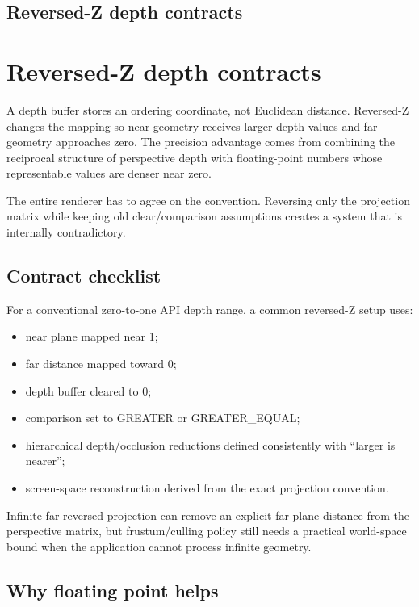 \hypertarget{appendix-275ec8847057}{}
\section*{Reversed-Z depth contracts}
\chapter{Reversed-Z depth contracts}\label{appendix-275ec8847057-reversed-z-depth-contracts}

A depth buffer stores an ordering coordinate, not Euclidean distance. Reversed-Z changes the mapping so near geometry receives larger depth values and far geometry approaches zero. The precision advantage comes from combining the reciprocal structure of perspective depth with floating-point numbers whose representable values are denser near zero.

The entire renderer has to agree on the convention. Reversing only the projection matrix while keeping old clear/comparison assumptions creates a system that is internally contradictory.

\section{Contract checklist}\label{appendix-275ec8847057-contract-checklist}

For a conventional zero-to-one API depth range, a common reversed-Z setup uses:

\begin{itemize}
\tightlist
\item
  near plane mapped near 1;
\item
  far distance mapped toward 0;
\item
  depth buffer cleared to 0;
\item
  comparison set to GREATER or GREATER\_EQUAL;
\item
  hierarchical depth/occlusion reductions defined consistently with ``larger is nearer'';
\item
  screen-space reconstruction derived from the exact projection convention.
\end{itemize}

Infinite-far reversed projection can remove an explicit far-plane distance from the perspective matrix, but frustum/culling policy still needs a practical world-space bound when the application cannot process infinite geometry.

\section{Why floating point helps}\label{appendix-275ec8847057-why-floating-point-helps}

